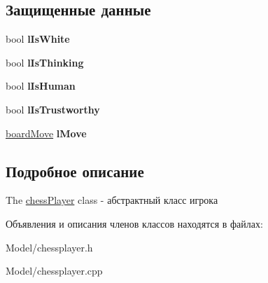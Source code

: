 \subsection*{Защищенные данные}
\begin{DoxyCompactItemize}
\item 
\hypertarget{classchess_player_a06252c21a45bb0b798b49f84a1d1dd5c}{}bool {\bfseries l\+Is\+White}\label{classchess_player_a06252c21a45bb0b798b49f84a1d1dd5c}

\item 
\hypertarget{classchess_player_aaeb0f6b585c49c7868040d96d8b9f297}{}bool {\bfseries l\+Is\+Thinking}\label{classchess_player_aaeb0f6b585c49c7868040d96d8b9f297}

\item 
\hypertarget{classchess_player_a566b824ad83a12cb505a48b2d4e1e4a4}{}bool {\bfseries l\+Is\+Human}\label{classchess_player_a566b824ad83a12cb505a48b2d4e1e4a4}

\item 
\hypertarget{classchess_player_aa282876d37f09361f03934fbc0cb5465}{}bool {\bfseries l\+Is\+Trustworthy}\label{classchess_player_aa282876d37f09361f03934fbc0cb5465}

\item 
\hypertarget{classchess_player_ac92aea6b6a84c5fd37c527fc22b441a2}{}\hyperlink{classboard_move}{board\+Move} {\bfseries l\+Move}\label{classchess_player_ac92aea6b6a84c5fd37c527fc22b441a2}

\end{DoxyCompactItemize}


\subsection{Подробное описание}
The \hyperlink{classchess_player}{chess\+Player} class -\/ абстрактный класс игрока 

Объявления и описания членов классов находятся в файлах\+:\begin{DoxyCompactItemize}
\item 
Model/chessplayer.\+h\item 
Model/chessplayer.\+cpp\end{DoxyCompactItemize}
